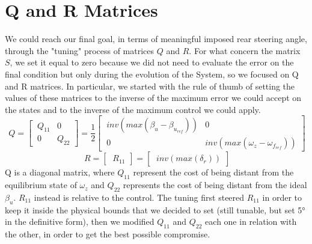 \section{Q and R Matrices}
We could reach our final goal, in terms of meaningful imposed rear steering angle, through the "tuning" process of matrices $Q$ and $R$. For what concern the matrix $S$, we set it equal to zero because we did not need to evaluate the error on the final condition but only during the evolution of the System, so we focused on Q and R matrices. In particular, we started with the rule of thumb of setting the values of these matrices to the inverse of the maximum error we could accept on the states and to the inverse of the maximum control we could apply.
\begin{equation} \label{Q MAtrix}
	\ Q =
	\begin{bmatrix}
	\ Q_{11} & 0\\
	\ 0 & Q_{22}
	\end{bmatrix} = \frac{1}{2}
	\begin{bmatrix}
	\ inv(max(\beta_{u}-\beta_{u_{ref}})) & 0\\
	\ 0 & inv(max(\omega_{z}-\omega_{f_{ref}}))
	\end{bmatrix}
\end{equation}
\begin{equation} \label{R MAtrix}
	\ R =
	\begin{bmatrix}
	\ R_{11}
	\end{bmatrix} =
	\begin{bmatrix}
	\ inv(max(\delta_{r}))
	\end{bmatrix}
\end{equation}
Q is a diagonal matrix, where $ Q_{11} $ represent the cost of being distant from the equilibrium state of $ \omega_{z} $ and $ Q_{22} $ represents the cost of being distant from the ideal $ \beta_{u} $. $ R_{11} $ instead is relative to the control.
The tuning first steered $ R_{11} $ in order to keep it inside the physical bounds that we decided to set (still tunable, but set 5° in the definitive form), then we modified $ Q_{11} $ and $ Q_{22} $ each one in relation with the other, in order to get the best possible compromise.
